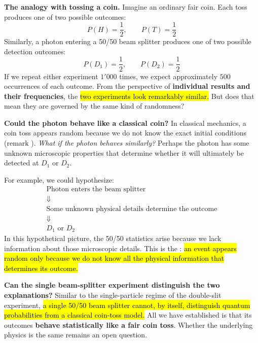\highspace
\textcolor{Green3}{ \textbf{The analogy with tossing a coin.}} Imagine an ordinary fair coin. Each toss produces one of two possible outcomes:
\begin{equation*}
    P(H)=\frac{1}{2},\qquad P(T)=\frac{1}{2}
\end{equation*}
Similarly, a photon entering a 50/50 beam splitter produces one of two possible detection outcomes:
\begin{equation*}
    P(D_1)=\frac{1}{2},\qquad P(D_2)=\frac{1}{2}
\end{equation*}
If we repeat either experiment $1'000$ times, we expect approximately $500$ occurrences of each outcome. From the perspective of \textbf{individual results and their frequencies}, the \hl{two experiments look remarkably similar.} But does that mean they are governed by the same kind of randomness?

\highspace
\textcolor{Green3}{ \textbf{Could the photon behave like a classical coin?}} In classical mechanics, a coin toss appears random because we do not know the exact initial conditions (remark ). \emph{What if the photon behaves similarly?} Perhaps the photon has some unknown microscopic properties that determine whether it will ultimately be detected at $D_1$ or $D_2$.

\highspace
For example, we could hypothesize:
\begin{equation*}
    \begin{gathered}
        \text{Photon enters the beam splitter}\\
        \Downarrow\\
        \text{Some unknown physical details determine the outcome}\\
        \Downarrow\\
        D_1\text{ or }D_2
    \end{gathered}
\end{equation*}
In this hypothetical picture, the 50/50 statistics arise because we lack information about those microscopic details. This is the : \hl{an event appears random only because we do not know all the physical information that determines its outcome.}

\highspace
\textcolor{Green3}{ \textbf{Can the single beam-splitter experiment distinguish the two explanations?}} Similar to the single-particle regime of the double-slit experiment, \hl{a single 50/50 beam splitter cannot, by itself, distinguish quantum probabilities from a classical coin-toss model.} All we have established is that its outcomes \textbf{behave statistically like a fair coin toss}. Whether the underlying physics is the same remains an open question.

